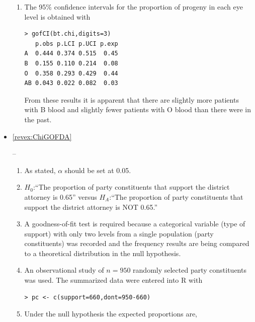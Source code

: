 \documentclass[10pt,openany]{book}\usepackage[]{graphicx}\usepackage[]{color}
\makeatletter
\newenvironment{kframe}{%
 \def\at@end@of@kframe{}%
 \ifinner\ifhmode%
  \def\at@end@of@kframe{\end{minipage}}%
  \begin{minipage}{\columnwidth}%
 \fi\fi%
 \def\FrameCommand##1{\hskip\@totalleftmargin \hskip-\fboxsep
 \colorbox{shadecolor}{##1}\hskip-\fboxsep
     \hskip-\linewidth \hskip-\@totalleftmargin \hskip\columnwidth}%
 \MakeFramed {\advance\hsize-\width
   \@totalleftmargin\z@ \linewidth\hsize
   \@setminipage}}%
 {\par\unskip\endMakeFramed%
 \at@end@of@kframe}
\newenvironment{knitrout}{}{} %
\makeatother
\begin{document}
\begin{itemize}
\begin{enumerate}
      \item The 95\% confidence intervals for the proportion of progeny in each eye level is obtained with
\begin{knitrout}
\color{fgcolor}\begin{kframe}
\begin{verbatim}
> gofCI(bt.chi,digits=3)
   p.obs p.LCI p.UCI p.exp
A  0.444 0.374 0.515  0.45
B  0.155 0.110 0.214  0.08
O  0.358 0.293 0.429  0.44
AB 0.043 0.022 0.082  0.03
\end{verbatim}
\end{kframe}
\end{knitrout}
From these results it is apparent that there are slightly more patients with B blood and slightly fewer patients with O blood than there were in the past.
  \end{enumerate}
  \item \hypertarget{ans:ChiGOFDA}{\ref{revex:ChiGOFDA}} --
    \begin{enumerate}
      \item As stated, $\alpha$ should be set at 0.05.
      \item $H_{0}$:``The proportion of party constituents that support the district attorney is 0.65'' versus $H_{A}$:``The proportion of party constituents that support the district attorney is NOT 0.65.''
      \item A goodness-of-fit test is required because a categorical variable (type of support) with only two levels  from a single population (party constituents) was recorded and the frequency results are being compared to a theoretical distribution in the null hypothesis.
      \item An observational study of $n=950$ randomly selected party constituents was used.  The summarized data were entered into R with
\begin{knitrout}
\color{fgcolor}\begin{kframe}
\begin{verbatim}
> pc <- c(support=660,dont=950-660)
\end{verbatim}
\end{kframe}
\end{knitrout}
      \item Under the null hypothesis the expected proportions are,
\begin{knitrout}
\color{fgcolor}\begin{kframe}

\end{kframe}
\end{knitrout}
\end{enumerate}
\end{itemize}
\end{document}

